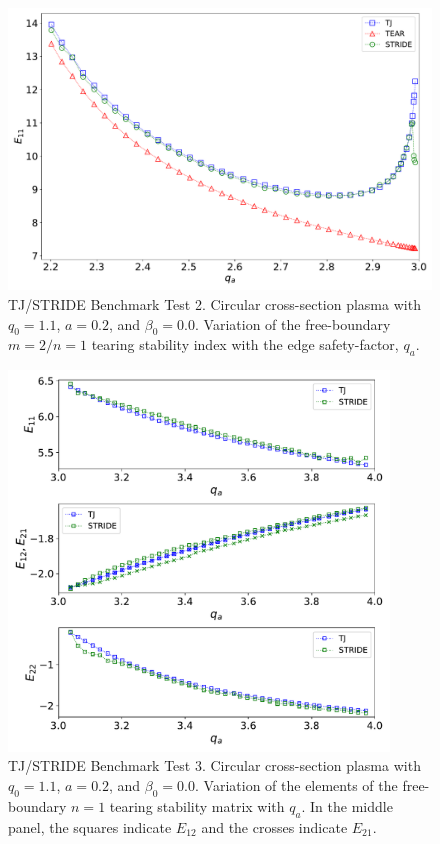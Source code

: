 \documentclass[12pt,prb,aps]{revtex4-1}
\begin{document}
\begin{figure}
\centerline{\includegraphics[width=\textwidth]{Fig2.pdf}}
\caption{TJ/STRIDE Benchmark Test 2. Circular cross-section plasma with  $q_0=1.1$, $a=0.2$, and $\beta_0=0.0$. Variation of the free-boundary  $m=2/n=1$ tearing stability index with  the edge safety-factor, $q_a$.\label{fig2} }
\end{figure}

\begin{figure}
\centerline{\includegraphics[width=0.9\textwidth]{Fig3.pdf}}
\caption{TJ/STRIDE Benchmark Test 3. Circular cross-section plasma with $q_0=1.1$, $a=0.2$, and $\beta_0=0.0$. Variation of the elements of the free-boundary $n=1$ tearing stability matrix with $q_a$. In the middle panel, the squares
indicate  $E_{12}$ and the crosses indicate $E_{21}$. \label{fig3}}
\end{figure}
\end{document}
